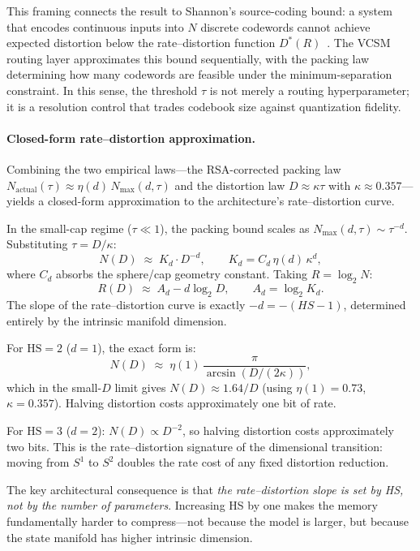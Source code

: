 \documentclass[11pt]{article}
\begin{document}
This framing connects the result to Shannon's source-coding bound: a
system that encodes continuous inputs into $N$ discrete codewords cannot
achieve expected distortion below the rate--distortion function
$D^*(R)$~\cite{shannon1959}.
The VCSM routing layer approximates this bound sequentially, with the
packing law determining how many codewords are feasible under the
minimum-separation constraint.
In this sense, the threshold $\tau$ is not merely a routing hyperparameter;
it is a resolution control that trades codebook size against quantization
fidelity.

\paragraph{Closed-form rate--distortion approximation.}
Combining the two empirical laws---the RSA-corrected packing law
$N_{\mathrm{actual}}(\tau) \approx \eta(d)\, N_{\max}(d,\tau)$ and the
distortion law $D \approx \kappa\tau$ with $\kappa \approx 0.357$---yields
a closed-form approximation to the architecture's rate--distortion curve.

In the small-cap regime ($\tau \ll 1$), the packing bound scales as
$N_{\max}(d,\tau) \sim \tau^{-d}$.
Substituting $\tau = D/\kappa$:
\[
  N(D) \;\approx\; K_d \cdot D^{-d},
  \qquad K_d = C_d\,\eta(d)\,\kappa^d,
\]
where $C_d$ absorbs the sphere/cap geometry constant.
Taking $R = \log_2 N$:
\[
  \boxed{R(D) \;\approx\; A_d - d\log_2 D},
  \qquad A_d = \log_2 K_d.
\]
The slope of the rate--distortion curve is exactly $-d = -(HS-1)$,
determined entirely by the intrinsic manifold dimension.

For $\mathrm{HS}=2$ ($d=1$), the exact form is:
\[
  N(D) \;\approx\; \eta(1)\,\frac{\pi}{\arcsin(D/(2\kappa))},
\]
which in the small-$D$ limit gives $N(D) \approx 1.64/D$ (using
$\eta(1) = 0.73$, $\kappa = 0.357$).
Halving distortion costs approximately one bit of rate.

For $\mathrm{HS}=3$ ($d=2$):
$N(D) \propto D^{-2}$, so halving distortion costs approximately two bits.
This is the rate--distortion signature of the dimensional transition:
moving from $S^1$ to $S^2$ doubles the rate cost of any fixed distortion
reduction.

The key architectural consequence is that \emph{the rate--distortion slope
is set by HS, not by the number of parameters}.
Increasing HS by one makes the memory fundamentally harder to compress---not
because the model is larger, but because the state manifold has higher
intrinsic dimension.
\end{document}
